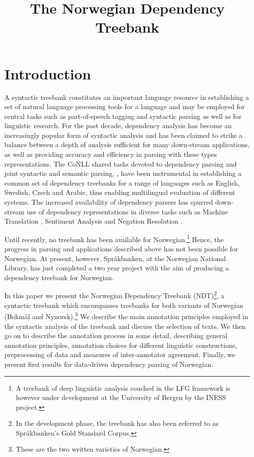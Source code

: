 \documentclass[10pt,a4paper]{article}
\title{The Norwegian Dependency Treebank}
\date{}
\begin{document}
\maketitleabstract

\section{Introduction}
A syntactic treebank constitutes an important language resource in
establishing a set of natural language processing tools for a
language and may be employed for central tasks such as part-of-speech
tagging and syntactic parsing as well as for linguistic research. For the past decade, dependency
analysis has become an increasingly popular form of syntactic analysis
and has been claimed to strike a balance between a depth of analysis
sufficient for many down-stream applications, as well as providing accuracy and
efficiency in parsing with these types representations. The CoNLL
shared tasks devoted to dependency parsing and joint syntactic and
semantic parsing,
\cite{Niv:Hal:Kub:07,Haj:Cia:Joh:09}, have been instrumental in
establishing a common set of dependency treebanks for a range of
languages such as English, Swedish, Czech and Arabic, %
thus enabling multilingual evaluation of different systems.  The increased
availability of dependency parsers has spurred down-stream use of
dependency representations in diverse tasks such as Machine Translation \cite{Din:Pal:05}, Sentiment Analysis \cite{Wil:Wie:Hof:09} and Negation Resolution \cite{Lap:Vel:Ovr:12}.

Until recently, no treebank has been available for
Norwegian.\footnote{A treebank of deep linguistic analysis couched in
  the LFG framework is however under development at the University of Bergen
  by the INESS project.}
Hence, the progress in parsing and applications
described above has not been possible for Norwegian.
At present, however, Spr{\aa}kbanken, at the Norwegian National Library,
has just completed a two year project with the aim of
producing a dependency treebank for Norwegian.

In this paper we present the Norwegian Dependency Treebank
(NDT)\footnote{In the development phase, the treebank has also been
  referred to as Språkbanken's Gold Standard Corpus.}, a syntactic
treebank which encompasses treebanks for both variants of Norwegian
(Bokm{\aa}l and Nynorsk).\footnote{These are the two written varieties
  of Norwegian.}  We describe the main annotation principles employed
in the syntactic analysis of the treebank and discuss the selection of
texts. We then go on to describe the annotation process in some
detail, describing general annotation principles, annotation choices
for different linguistic constructions, preprocessing of data and
measures of inter-annotator agreement. Finally, we present first
results for data-driven dependency parsing of Norwegian.
\end{document}
